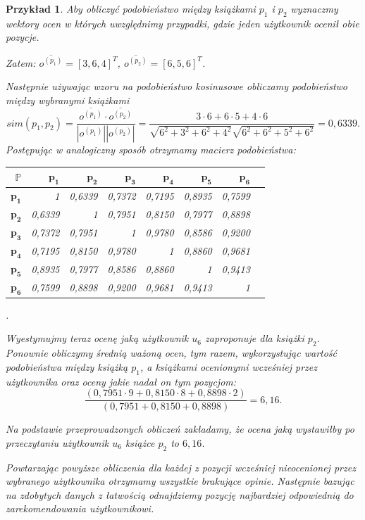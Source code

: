 \documentclass[12pt,a4paper]{report}
\newtheorem{przyklad}{Przykład}[chapter]
\begin{document}
\begin{przyklad}
Aby obliczyć podobieństwo między książkami $p_1$ i $p_2$ wyznaczmy wektory ocen w których uwzględnimy przypadki, gdzie jeden użytkownik ocenił obie pozycje.

Zatem: $\overline{o^{(p_1)}} = [3, 6, 4]^T$, $\overline{o^{(p_2)}} =[6, 5, 6]^T$.

Następnie używając wzoru na podobieństwo kosinusowe obliczamy podobieństwo między wybranymi książkami
$$
sim(p_1,p_2) = \frac{\overline{o^{(p_1)}} \cdot \overline{o^{(p_2)}}}{|o^{(p_1)}||o^{(p_2)}|} = \frac{3 \cdot 6 + 6 \cdot 5 + 4 \cdot 6}{\sqrt{6^2 + 3^2 + 6^2 + 4^2} \sqrt{6^2 + 6^2 + 5^2 + 6^2}} = 0,6339.
$$
Postępując w analogiczny sposób otrzymamy macierz podobieństwa:
\begin{center}
\begin{tabular}{|r|r|r|r|r|r|r|r|} \hline
$\mathbb{P}$ & $\mathbf{p_1}$ & $\mathbf{p_2}$ & $\mathbf{p_3}$ & $\mathbf{p_4}$ & $\mathbf{p_5}$ & $\mathbf{p_6}$ \\
\hline
$\mathbf{p_1}$ & 1 & 0,6339 & 0,7372 & 0,7195 & 0,8935 & 0,7599 \\
\hline
$\mathbf{p_2}$ & 0,6339 & 1 & 0,7951 & 0,8150 & 0,7977 & 0,8898 \\
\hline
$\mathbf{p_3}$ & 0,7372 & 0,7951 & 1 & 0,9780 & 0,8586 & 0,9200 \\
\hline
$\mathbf{p_4}$ & 0,7195 & 0,8150 & 0,9780 & 1 & 0,8860 & 0,9681 \\
\hline 
$\mathbf{p_5}$ & 0,8935 & 0,7977 & 0,8586 & 0,8860 & 1 & 0,9413 \\
\hline 
$\mathbf{p_6}$ & 0,7599 & 0,8898 & 0,9200 & 0,9681 & 0,9413 & 1 \\
\hline 
\end{tabular}.
\end{center}
Wyestymujmy teraz ocenę jaką użytkownik $u_6$ zaproponuje dla książki $p_2$. Ponownie obliczymy średnią ważoną ocen, tym razem, wykorzystując wartość podobieństwa między książką $p_1$, a książkami ocenionymi wcześniej przez użytkownika oraz oceny jakie nadał on tym pozycjom:
$$
\frac{(0,7951 \cdot 9 + 0,8150 \cdot 8 + 0,8898 \cdot 2)}{(0,7951 + 0,8150 + 0,8898)} = 6,16.
$$

Na podstawie przeprowadzonych obliczeń zakładamy, że ocena jaką wystawiłby po przeczytaniu użytkownik $u_6$ książce $p_2$ to $6,16$.

Powtarzając powyższe obliczenia dla każdej z pozycji wcześniej nieocenionej przez wybranego użytkownika otrzymamy wszystkie brakujące opinie. Następnie bazując na zdobytych danych z łatwością odnajdziemy pozycję najbardziej odpowiednią do zarekomendowania użytkownikowi.
\end{przyklad}
\end{document}
